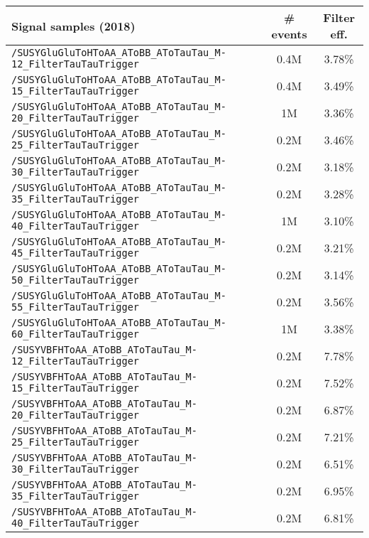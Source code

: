     \begin{table}[ht]
    \begin{center}
    {\scriptsize
    \begin{tabular}{|l|c|c|}
    \hline
    Signal samples (2018) & \# events & Filter eff.\\
    \hline
    \texttt{/SUSYGluGluToHToAA\_AToBB\_AToTauTau\_M-12\_FilterTauTauTrigger} & 0.4M & 3.78\%\\
    \texttt{/SUSYGluGluToHToAA\_AToBB\_AToTauTau\_M-15\_FilterTauTauTrigger} & 0.4M & 3.49\%\\
    \texttt{/SUSYGluGluToHToAA\_AToBB\_AToTauTau\_M-20\_FilterTauTauTrigger} & 1M & 3.36\%\\
    \texttt{/SUSYGluGluToHToAA\_AToBB\_AToTauTau\_M-25\_FilterTauTauTrigger} & 0.2M & 3.46\%\\
    \texttt{/SUSYGluGluToHToAA\_AToBB\_AToTauTau\_M-30\_FilterTauTauTrigger} & 0.2M & 3.18\%\\
    \texttt{/SUSYGluGluToHToAA\_AToBB\_AToTauTau\_M-35\_FilterTauTauTrigger} & 0.2M & 3.28\%\\
    \texttt{/SUSYGluGluToHToAA\_AToBB\_AToTauTau\_M-40\_FilterTauTauTrigger} & 1M & 3.10\%\\
    \texttt{/SUSYGluGluToHToAA\_AToBB\_AToTauTau\_M-45\_FilterTauTauTrigger} & 0.2M & 3.21\%\\
    \texttt{/SUSYGluGluToHToAA\_AToBB\_AToTauTau\_M-50\_FilterTauTauTrigger} & 0.2M & 3.14\%\\
    \texttt{/SUSYGluGluToHToAA\_AToBB\_AToTauTau\_M-55\_FilterTauTauTrigger} & 0.2M & 3.56\%\\
    \texttt{/SUSYGluGluToHToAA\_AToBB\_AToTauTau\_M-60\_FilterTauTauTrigger} & 1M & 3.38\%\\
    \hline
    \texttt{/SUSYVBFHToAA\_AToBB\_AToTauTau\_M-12\_FilterTauTauTrigger} & 0.2M & 7.78\%\\
    \texttt{/SUSYVBFHToAA\_AToBB\_AToTauTau\_M-15\_FilterTauTauTrigger} & 0.2M & 7.52\%\\
    \texttt{/SUSYVBFHToAA\_AToBB\_AToTauTau\_M-20\_FilterTauTauTrigger} & 0.2M & 6.87\%\\
    \texttt{/SUSYVBFHToAA\_AToBB\_AToTauTau\_M-25\_FilterTauTauTrigger} & 0.2M & 7.21\%\\
    \texttt{/SUSYVBFHToAA\_AToBB\_AToTauTau\_M-30\_FilterTauTauTrigger} & 0.2M & 6.51\%\\
    \texttt{/SUSYVBFHToAA\_AToBB\_AToTauTau\_M-35\_FilterTauTauTrigger} & 0.2M & 6.95\%\\
    \texttt{/SUSYVBFHToAA\_AToBB\_AToTauTau\_M-40\_FilterTauTauTrigger} & 0.2M & 6.81\%\\

\end{tabular}}
\end{center}
\end{table}
